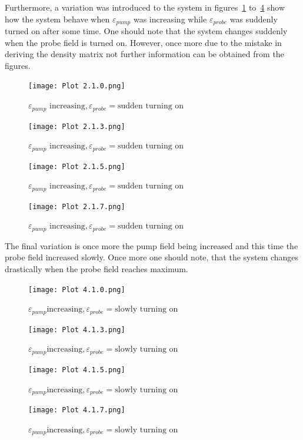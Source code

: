 \documentclass[12pt, a4paper]{article}
\begin{document}
Furthermore, a variation was introduced to the system in figures~\ref{fig:fig2.1.0} to~\ref{fig:fig2.1.7} show how the system behave when \(\varepsilon_{pump}\) was increasing while \(\varepsilon_{probe}\) was suddenly turned on after some time. One should note that the system changes suddenly when the probe field is turned on. However, once more due to the mistake in deriving the density matrix not further information can be obtained from the figures.

\begin{figure}[H]
  \centering
  \texttt{[image: Plot 2.1.0.png]}\caption{\(\varepsilon_{pump} \text{ increasing}, \varepsilon_{probe}= \text{sudden turning on}\)}\label{fig:fig2.1.0}
\end{figure}
\begin{figure}[H]
  \centering
  \texttt{[image: Plot 2.1.3.png]}\caption{\(\varepsilon_{pump} \text{ increasing}, \varepsilon_{probe}= \text{sudden turning on}\)}\label{fig:fig2.1.3}
\end{figure}
\begin{figure}[H]
  \centering
  \texttt{[image: Plot 2.1.5.png]}\caption{\(\varepsilon_{pump} \text{ increasing}, \varepsilon_{probe}= \text{sudden turning on}\)}\label{fig:fig2.1.5}
\end{figure}
\begin{figure}[H]
  \centering
  \texttt{[image: Plot 2.1.7.png]}\caption{\(\varepsilon_{pump} \text{ increasing}, \varepsilon_{probe}= \text{sudden turning on}\)}\label{fig:fig2.1.7}
\end{figure}

The final variation is once more the pump field being increased and this time the probe field increased slowly. Once more one should note, that the system changes drastically when the probe field reaches maximum.

\begin{figure}[H]
  \centering
  \texttt{[image: Plot 4.1.0.png]}\caption{\(\varepsilon_{pump} \text{increasing}, \varepsilon_{probe}=\text{slowly turning on}\)}\label{fig:fig4.1.0}
\end{figure}
\begin{figure}[H]
  \centering
  \texttt{[image: Plot 4.1.3.png]}\caption{\(\varepsilon_{pump} \text{increasing}, \varepsilon_{probe}=\text{slowly turning on}\)}\label{fig:fig4.1.3}
\end{figure}
\begin{figure}[H]
  \centering
  \texttt{[image: Plot 4.1.5.png]}\caption{\(\varepsilon_{pump} \text{increasing}, \varepsilon_{probe}=\text{slowly turning on}\)}\label{fig:fig4.1.5}
\end{figure}
\begin{figure}[H]
  \centering
  \texttt{[image: Plot 4.1.7.png]}\caption{\(\varepsilon_{pump} \text{increasing}, \varepsilon_{probe}=\text{slowly turning on}\)}\label{fig:fig4.1.7}
\end{figure}
\end{document}
